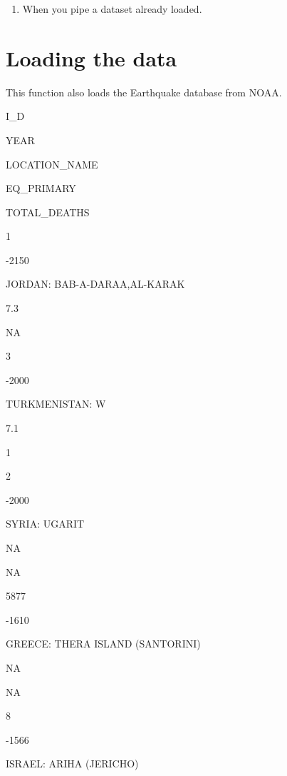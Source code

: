 \documentclass[]{book}
\newenvironment{Shaded}{\begin{snugshade}}{\end{snugshade}}
\newcommand{\KeywordTok}[1]{\textcolor[rgb]{0.13,0.29,0.53}{\textbf{#1}}}
\newcommand{\DataTypeTok}[1]{\textcolor[rgb]{0.13,0.29,0.53}{#1}}
\newcommand{\CharTok}[1]{\textcolor[rgb]{0.31,0.60,0.02}{#1}}
\newcommand{\StringTok}[1]{\textcolor[rgb]{0.31,0.60,0.02}{#1}}
\newcommand{\CommentTok}[1]{\textcolor[rgb]{0.56,0.35,0.01}{\textit{#1}}}
\newcommand{\OperatorTok}[1]{\textcolor[rgb]{0.81,0.36,0.00}{\textbf{#1}}}
\newcommand{\NormalTok}[1]{#1}
\providecommand{\tightlist}{%
  \setlength{\itemsep}{0pt}\setlength{\parskip}{0pt}}
\begin{document}
\begin{enumerate}
\def\labelenumi{\arabic{enumi})}
\setcounter{enumi}{1}
\tightlist
\item
  When you pipe a dataset already loaded.
\end{enumerate}

\begin{Shaded}
\end{Shaded}

\section{Loading the data}\label{load_data}

This function also loads the Earthquake database from NOAA.

I\_D

YEAR

LOCATION\_NAME

EQ\_PRIMARY

TOTAL\_DEATHS

1

-2150

JORDAN: BAB-A-DARAA,AL-KARAK

7.3

NA

3

-2000

TURKMENISTAN: W

7.1

1

2

-2000

SYRIA: UGARIT

NA

NA

5877

-1610

GREECE: THERA ISLAND (SANTORINI)

NA

NA

8

-1566

ISRAEL: ARIHA (JERICHO)
\end{document}
